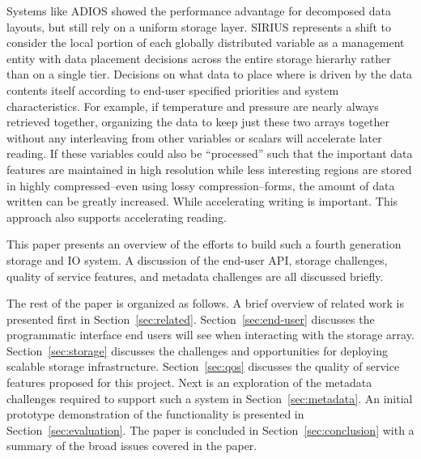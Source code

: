 \documentclass{sig-alt-gov2}
\begin{document}
Systems like ADIOS showed the performance advantage for decomposed data
layouts, but still rely on a uniform storage layer. SIRIUS represents a shift
to consider the local portion of each globally distributed variable as a
management entity with data placement decisions across the entire storage
hierarhy rather than on a single tier.  Decisions on what data to place where
is driven by the data contents itself according to end-user specified
priorities and system characteristics. For example, if temperature and pressure
are nearly always retrieved together, organizing the data to keep just these
two arrays together without any interleaving from other variables or scalars
will accelerate later reading. If these variables could also be ``processed''
such that the important data features are maintained in high resolution while
less interesting regions are stored in highly compressed--even using lossy
compression--forms, the amount of data written can be greatly increased. While
accelerating writing is important. This approach also supports accelerating
reading.

This paper presents an overview of the efforts to build such a fourth
generation storage and IO system. A discussion of the end-user API, storage
challenges, quality of service features, and metadata challenges are all
discussed briefly.


The rest of the paper is organized as follows. A brief overview of related work
is presented first in Section~\ref{sec:related}. Section~\ref{sec:end-user}
discusses the programmatic interface end users will see when interacting with
the storage array.
Section~\ref{sec:storage}
discusses the challenges and opportunities for deploying scalable storage
infrastructure.
Section~\ref{sec:qos} 
discusses the quality of service features proposed for this project.
Next is an exploration of the metadata challenges required to support such a
system in Section~\ref{sec:metadata}.
An initial prototype demonstration of the functionality is presented in
Section~\ref{sec:evaluation}.
The paper is concluded in
Section~\ref{sec:conclusion} with a summary of the broad issues covered in the
paper.
\end{document}
